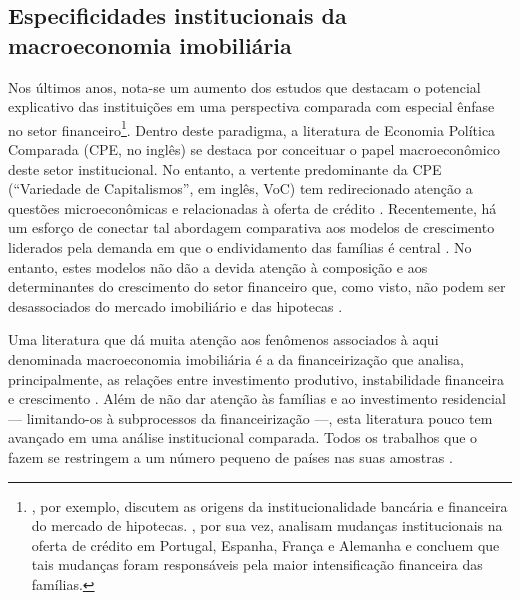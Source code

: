 \subsection{Especificidades institucionais da macroeconomia imobiliária}

Nos últimos anos, nota-se um aumento dos estudos que destacam o potencial explicativo das instituições em uma perspectiva comparada com especial ênfase no setor financeiro\footnote{
    \textcite{blackwell_origins_2018}, por exemplo, discutem as origens da institucionalidade bancária e financeira do mercado de hipotecas. \textcite{van_gunten_varieties_2018}, por sua vez, analisam mudanças institucionais na oferta de crédito em Portugal, Espanha, França e Alemanha e concluem que tais mudanças foram responsáveis pela maior intensificação financeira das famílias.
}.
Dentro deste paradigma, a literatura de Economia Política Comparada (CPE, no inglês) se destaca por conceituar o papel macroeconômico deste setor institucional.
No entanto, a vertente predominante da CPE (``Variedade de Capitalismos'', em inglês, VoC) tem redirecionado atenção a questões microeconômicas e relacionadas à oferta de crédito \cite{schwartz_thinking_2019}.
Recentemente, há um esforço de conectar tal abordagem comparativa aos modelos de crescimento liderados pela demanda em que o endividamento das famílias  é central \cite{baccaro_rethinking_2016}.
No entanto, 
estes modelos %
não dão a devida atenção à composição e aos determinantes do crescimento do setor financeiro que, como visto, não podem ser desassociados do mercado imobiliário e das hipotecas \cite{wood_house_2020}.

Uma literatura que dá muita atenção aos fenômenos associados à aqui denominada macroeconomia imobiliária é a da financeirização que analisa, principalmente, as relações entre investimento produtivo, instabilidade financeira e crescimento \cites{stockhammer_financialisation_2004}{hein_demise_2015}{detzer_financialization_2019}. %
Além de não dar atenção às famílias e ao investimento residencial --- limitando-os à subprocessos da financeirização \cites{aalbers_financialization_2008}{schwartz_politics_2009}{bibow_financialization_2010} ---, esta literatura pouco tem avançado em uma análise institucional comparada. 
Todos os trabalhos que o fazem se restringem a um número pequeno de países nas suas amostras \cites{becker_peripheral_2010}{lapavitsas_financialisation_2013}. %

